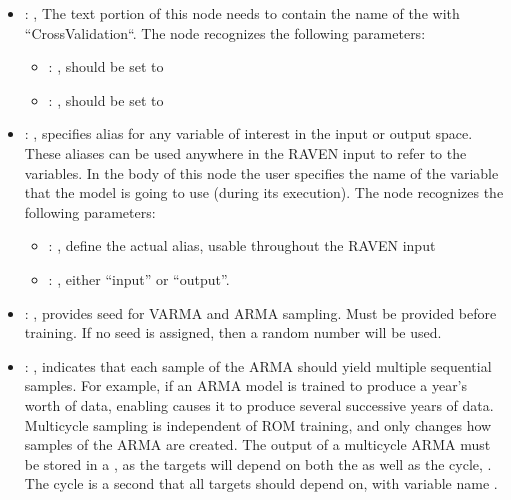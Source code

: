 \begin{itemize}
    \item {}: , 
      The text portion of this node needs to contain the name of the  with
               ``CrossValidation``.
      The  node recognizes the following parameters:
        \begin{itemize}
          \item {}: , 
            should be set to 
          \item {}: , 
            should be set to 
      \end{itemize}

    \item {}: , 
      specifies alias for         any variable of interest in the input or output space. These
      aliases can be used anywhere in the RAVEN input to         refer to the variables. In the body
      of this node the user specifies the name of the variable that the model is going to use
      (during its execution).
      The  node recognizes the following parameters:
        \begin{itemize}
          \item {}: , 
            define the actual alias, usable throughout the RAVEN input
          \item {}: , 
            either ``input'' or ``output''.
      \end{itemize}

    \item {}: , 
      provides seed for VARMA and ARMA sampling.
      Must be provided before training. If no seed is assigned,
      then a random number will be used.

    \item {}: , 
      indicates that each sample of the ARMA should yield
      multiple sequential samples. For example, if an ARMA model is trained to produce a year's
      worth of data,                                                    enabling
       causes it to produce several successive years of data. Multicycle
      sampling                                                    is independent of ROM training,
      and only changes how samples of the ARMA are created.
      \nb The output of a multicycle ARMA must be stored in a , as the targets will
      depend                                                    on both the 
      as well as the cycle, . The cycle is a second
       that all targets should depend on, with variable name .


\end{itemize}
